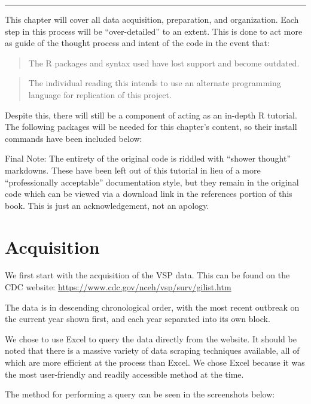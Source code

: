 \documentclass[
  11,
]{book}
\begin{document}
\begin{center}\rule{0.5\linewidth}{0.5pt}\end{center}

This chapter will cover all data acquisition, preparation, and organization. Each step in this process will be ``over-detailed'' to an extent. This is done to act more as guide of the thought process and intent of the code in the event that:

\begin{quote}
The R packages and syntax used have lost support and become outdated.
\end{quote}

\begin{quote}
The individual reading this intends to use an alternate programming language for replication of this project.
\end{quote}

Despite this, there will still be a component of acting as an in-depth R tutorial. The following packages will be needed for this chapter's content, so their install commands have been included below:

Final Note: The entirety of the original code is riddled with ``shower thought'' markdowns. These have been left out of this tutorial in lieu of a more ``professionally acceptable'' documentation style, but they remain in the original code which can be viewed via a download link in the references portion of this book. This is just an acknowledgement, not an apology.

\hypertarget{acquisition}{%
\section*{Acquisition}\label{acquisition}}


We first start with the acquisition of the VSP data. This can be found on the CDC website: \url{https://www.cdc.gov/nceh/vsp/surv/gilist.htm}

The data is in descending chronological order, with the most recent outbreak on the current year shown first, and each year separated into its own block.

We chose to use Excel to query the data directly from the website. It should be noted that there is a massive variety of data scraping techniques available, all of which are more efficient at the process than Excel. We chose Excel because it was the most user-friendly and readily accessible method at the time.

The method for performing a query can be seen in the screenshots below:
\end{document}
